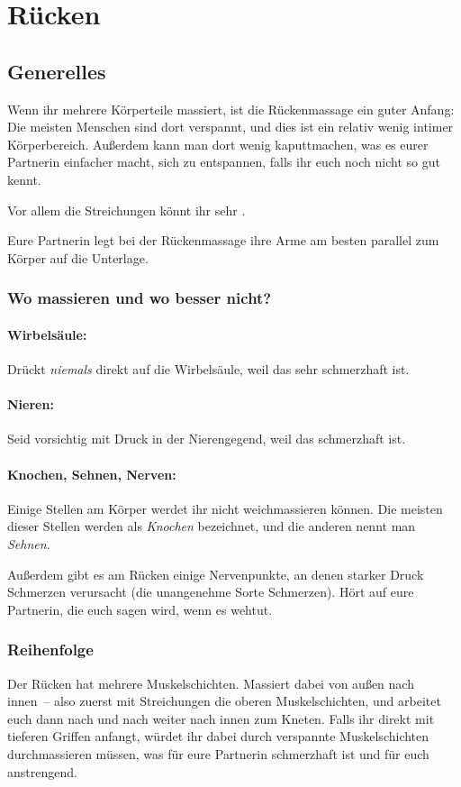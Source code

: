 \section{Rücken}

\subsection{Generelles}

Wenn ihr mehrere Körperteile massiert, ist die Rückenmassage ein guter Anfang: Die meisten Menschen sind dort verspannt, und dies ist ein relativ wenig intimer Körperbereich. Außerdem kann man dort wenig kaputtmachen, was es eurer Partnerin einfacher macht, sich zu entspannen, falls ihr euch noch nicht so gut kennt.

Vor allem die Streichungen könnt ihr sehr .

Eure Partnerin legt bei der Rückenmassage ihre Arme am besten parallel zum Körper auf die Unterlage.


\subsubsection{Wo massieren und wo besser nicht?}

\paragraph{Wirbelsäule:} Drückt \emph{niemals} direkt auf die Wirbelsäule, weil das sehr schmerzhaft ist.

\paragraph{Nieren:} Seid vorsichtig mit Druck in der Nierengegend, weil das schmerzhaft ist.

\paragraph{Knochen, Sehnen, Nerven:} Einige Stellen am Körper werdet ihr nicht weichmassieren können. Die meisten dieser Stellen werden als \emph{Knochen} bezeichnet, und die anderen nennt man \emph{Sehnen}.

Außerdem gibt es am Rücken einige Nervenpunkte, an denen starker Druck Schmerzen verursacht (die unangenehme Sorte Schmerzen). Hört auf eure Partnerin, die euch sagen wird, wenn es wehtut.


\subsubsection{Reihenfolge}
Der Rücken hat mehrere Muskelschichten. Massiert dabei von außen nach innen~-- also zuerst mit Streichungen die oberen Muskelschichten, und arbeitet euch dann nach und nach weiter nach innen zum Kneten. Falls ihr direkt mit tieferen Griffen anfangt, würdet ihr dabei durch verspannte Muskelschichten durchmassieren müssen, was für eure Partnerin schmerzhaft ist und für euch anstrengend.

